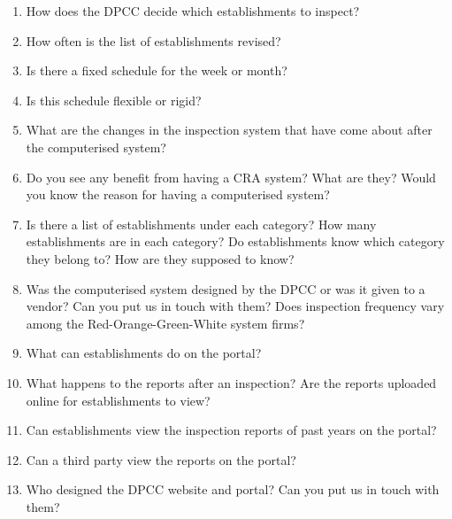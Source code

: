 \documentclass[a4paper, 12pt]{article}
\begin{document}
\begin{mdframed}[backgroundcolor=gray!20]
\begin{enumerate}
		\item{How does the DPCC decide which establishments to inspect?}
		\item{How often is the list of establishments revised?}
		\item{Is there a fixed schedule for the week or month?}
		\item{Is this schedule flexible or rigid?}
		\item{What are the changes in the inspection system that have come about after the computerised system?}
		\item{Do you see any benefit from having a CRA system? What are they? Would you know the reason for having a computerised system?}
		\item{Is there a list of establishments under each category? How many establishments are in each category? Do establishments know which category they belong to? How are they supposed to know?}
		\item{Was the computerised system designed by the DPCC or was it given to a vendor? Can you put us in touch with them? Does inspection frequency vary among the Red-Orange-Green-White system firms?}
		\item{What can establishments do on the portal?}
		\item{What happens to the reports after an inspection? Are the reports uploaded online for establishments to view?}
		\item{Can establishments view the inspection reports of past years on the portal?}
		\item{Can a third party view the reports on the portal?}
		\item{Who designed the DPCC website and portal? Can you put us in touch with them?}
		\end{enumerate}
		\end{mdframed}
		
\end{document}
